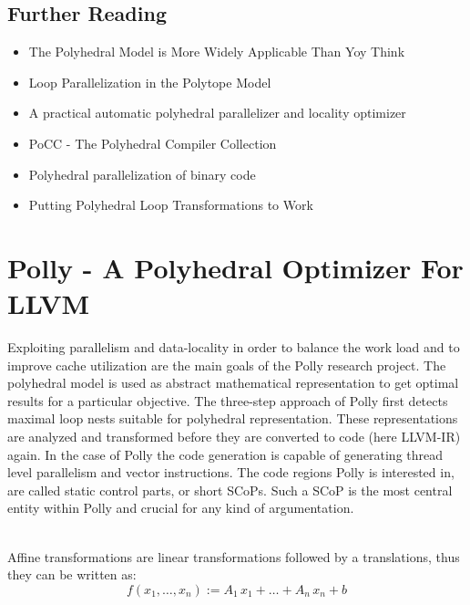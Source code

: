 \subsection*{Further Reading}
\begin{itemize}
  \item The Polyhedral Model is More Widely Applicable Than Yoy Think \cite{BPCB10}
  \item Loop Parallelization in the Polytope Model \cite{Lengauer93loopparallelization}  
  \item A practical automatic polyhedral parallelizer and locality optimizer \cite{Bondhugula:2008:PAP:1379022.1375595}
  \item PoCC - The Polyhedral Compiler Collection \cite{PoCC:Online}
  \item Polyhedral parallelization of binary code \cite{Pradelle:2012:PPB:2086696.2086718}
  \item Putting Polyhedral Loop Transformations to Work \cite{BCGST03} 
\end{itemize}

\clearpage

\section{Polly - A Polyhedral Optimizer For LLVM}
\label{Polly}
Exploiting parallelism and data-locality in order to balance the work load
and to improve cache utilization are the main goals of the Polly research project.
The polyhedral model is used as abstract mathematical representation to get optimal
results for a particular objective. The three-step approach of Polly first detects
maximal loop nests suitable for polyhedral representation. These representations
are analyzed and transformed before they are converted to code (here LLVM-IR)
again. In the case of Polly the code generation is capable of generating thread 
level parallelism and vector instructions. The code regions Polly is interested 
in, are called static control parts, or short SCoPs. Such a SCoP is 
the most central entity within Polly and crucial for any kind of argumentation.

\begin{definition} ~\\
  Affine transformations are linear transformations followed by a translations,
  thus they can be written as:
  \[ f(x_1,\dots,x_n) := A_1\, x_1 + \dots + A_n\, x_n + b\]

  \label{def:AffineTransformation}
\end{definition}

